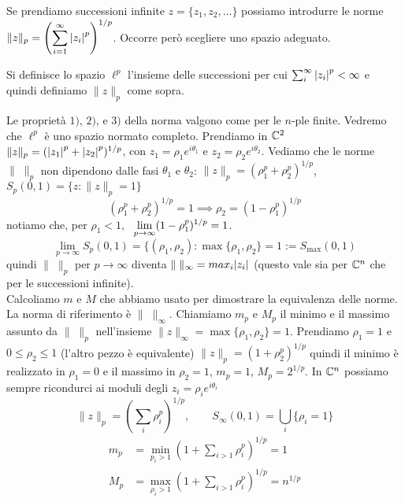 Se prendiamo successioni infinite $z = \{z_1, z_2, \ldots \}$ possiamo
introdurre le norme\\
$\displaystyle \|z\|_p = \left(\sum_{i=1}^\infty {\left|z_i\right|}^p\right)^{1/p}$.
Occorre però scegliere uno spazio adeguato. 

\begin{definition}
Si definisce lo spazio $\ell^p$ l'insieme delle successioni per cui
$\sum_i^{\infty} {\left|z_i\right|}^p < \infty$ e quindi definiamo $\|z\|_p$ come sopra.
\end{definition}
Le proprietà $1)$, $2)$, e $3)$ della norma valgono come per le $n$-ple
finite.
Vedremo che $\ell^p$ è uno spazio normato completo.
Prendiamo in $\mathbb C^2$ $\|z\|_p = ({\left|z_1\right|}^p + {\left|z_2\right|}^p)^{1/p}$,
con $z_1 = \rho_1 e^{i \theta_1}$ e $z_2 = \rho_2 e^{i \theta_2}$. Vediamo
che le norme $\| \; \|_p$ non dipendono dalle fasi $\theta_1$ e $\theta_2$:
$\|z\|_p = (\rho_1^p + \rho_2^p)^{1/p}$, $S_p(0,1) = \{z:\|z\|_p=1\}$
\[
(\rho_1^p + \rho_2^p)^{1/p} = 1 \implies \rho_2 = (1 - \rho_1^p)^{1/p}
\]
notiamo che, per $\rho_1 < 1, \;$ 
$\displaystyle \lim_{p \to \infty} (1 - \rho_1^p)^{1/p} = 1$.
\[
\lim_{p \to \infty} S_p(0, 1) = \{(\rho_1, \rho_2): \max \{\rho_1, \rho_2\} = 1
	:= S_{\max}(0, 1)
\]
quindi $\| \; \|_p$ per $p \to \infty$ diventa
$\| \; \|_{\infty} = max_i {\left|z_i\right|}$
(questo vale sia per $\mathbb C^n$ che per le successioni infinite).\\
Calcoliamo $m$ e $M$ che abbiamo usato per dimostrare la equivalenza
delle norme. La norma di riferimento è $\| \; \|_{\infty}$.
Chiamiamo $m_p$ e $M_p$ il minimo e il massimo assunto da $\| \; \|_p$
nell'insieme $\|z\|_{\infty} = \max \{\rho_1, \rho_2\}=1$.
Prendiamo $\rho_1 = 1$ e $0 \leq \rho_2 \leq 1$ (l'altro pezzo è equivalente)
$\|z\|_p = (1 + \rho_2^p)^{1/p}$
quindi il minimo è realizzato in $\rho_1 = 0$ e il massimo in $\rho_2 = 1$,
$m_p = 1$, $M_p = 2^{1/p}$.
In $\mathbb C^n$ possiamo sempre ricondurci ai moduli degli 
$z_i = \rho_i e^{i \theta_i}$
\[
\|z\|_p = \left(\sum_i \rho_i^p\right)^{1/p}, \qquad S_{\infty}(0, 1) =
\bigcup_i \{\rho_i = 1\}
\]
\begin{align*}
m_p &= \min_{p_i > 1} (1 + \sum_{i>1} \rho_i^p)^{1/p} = 1 \\
M_p &= \max_{\rho_i > 1} \left(1 + \sum_{i>1} \rho_i^p\right)^{1/p} = n^{1/p}
\end{align*}

